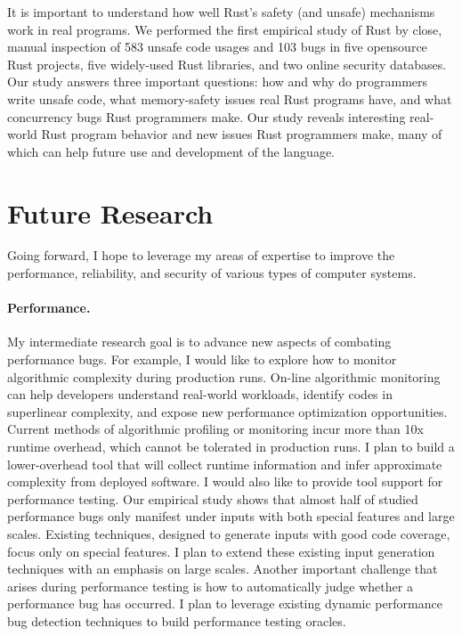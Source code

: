 \documentclass[10pt]{article}
\begin{document}
It is important to understand how well Rust’s safety (and
unsafe) mechanisms work in real programs. We performed
the first empirical study of Rust by close, manual inspection of 583 unsafe code usages 
and 103 bugs in five opensource Rust projects, five widely-used Rust libraries, and two
online security databases. Our study answers three important 
questions: how and why do programmers write unsafe
code, what memory-safety issues real Rust programs have,
and what concurrency bugs Rust programmers make. Our
study reveals interesting real-world Rust program behavior
and new issues Rust programmers make, many of which can
help future use and development of the language.


\section{Future Research}

Going forward, I hope to leverage my areas of expertise to improve the performance, 
reliability, and security of various types of computer systems. 

\vspace{-.1in}
\paragraph{Performance.} 
My intermediate research goal is to advance new aspects of combating performance bugs.
For example, I would like to explore how to monitor algorithmic complexity during production runs. 
On-line algorithmic monitoring can help developers understand real-world workloads, 
identify codes in superlinear complexity, 
and expose new performance optimization opportunities. 
Current methods of algorithmic profiling or monitoring incur more than 10x runtime overhead, which cannot be tolerated in production runs. 
I plan to build a lower-overhead tool that will collect runtime information 
and infer approximate complexity from deployed software. 
I would also like to provide tool support for performance testing.
Our empirical study shows that almost half of studied performance bugs only manifest 
under inputs with both special features and large scales.
Existing techniques, designed to generate inputs with good code coverage, focus only on special features.
I plan to extend these existing input generation techniques with an emphasis on large scales. 
Another important challenge that arises during performance testing is how to automatically judge whether a performance bug has occurred. 
I plan to leverage existing dynamic performance bug detection techniques to build performance testing oracles.
\end{document}
